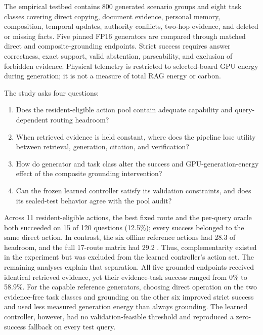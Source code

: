 The empirical testbed contains 800 generated scenario groups and eight task classes
covering direct copying, document evidence, personal memory, composition, temporal
updates, authority conflicts, two-hop evidence, and deleted or missing facts. Five
pinned FP16 generators are compared through matched direct and composite-grounding
endpoints. Strict success requires answer correctness, exact support, valid
abstention, parseability, and exclusion of forbidden evidence. Physical telemetry
is restricted to selected-board GPU energy during generation; it is not a measure
of total RAG energy or carbon.

The study asks four questions:

\begin{enumerate}
    \item[\textbf{RQ1}] Does the resident-eligible action pool contain adequate capability
    and query-dependent routing headroom?
    \item[\textbf{RQ2}] When retrieved evidence is held constant, where does the
    pipeline lose utility between retrieval, generation, citation, and verification?
    \item[\textbf{RQ3}] How do generator and task class alter the success and
    GPU-generation-energy effect of the composite grounding intervention?
    \item[\textbf{RQ4}] Can the frozen learned controller satisfy its validation
    constraints, and does its sealed-test behavior agree with the pool audit?
\end{enumerate}

Across 11 resident-eligible actions, the best fixed route and the per-query oracle
both succeeded on 15 of 120 questions (12.5\%); every
success belonged to the same direct action. In contrast, the six offline reference
actions had 28.3 \pp{} of headroom, and the full 17-route matrix had 29.2 \pp{}.
Thus, complementarity existed in the experiment but was excluded from the learned
controller's action set. The remaining analyses explain that separation. All five
grounded endpoints received identical retrieved evidence, yet their evidence-task
success ranged from 0\% to 58.9\%. For the capable reference generators, choosing
direct operation on the two evidence-free task classes and grounding on the other
six improved strict success and used less measured generation energy than always
grounding. The learned controller, however, had no validation-feasible threshold
and reproduced a zero-success fallback on every test query.

